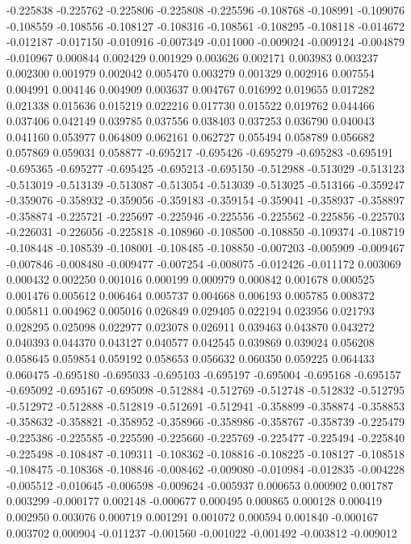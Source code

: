 -0.225838
-0.225762
-0.225806
-0.225808
-0.225596
-0.108768
-0.108991
-0.109076
-0.108559
-0.108556
-0.108127
-0.108316
-0.108561
-0.108295
-0.108118
-0.014672
-0.012187
-0.017150
-0.010916
-0.007349
-0.011000
-0.009024
-0.009124
-0.004879
-0.010967
0.000844
0.002429
0.001929
0.003626
0.002171
0.003983
0.003237
0.002300
0.001979
0.002042
0.005470
0.003279
0.001329
0.002916
0.007554
0.004991
0.004146
0.004909
0.003637
0.004767
0.016992
0.019655
0.017282
0.021338
0.015636
0.015219
0.022216
0.017730
0.015522
0.019762
0.044466
0.037406
0.042149
0.039785
0.037556
0.038403
0.037253
0.036790
0.040043
0.041160
0.053977
0.064809
0.062161
0.062727
0.055494
0.058789
0.056682
0.057869
0.059031
0.058877
-0.695217
-0.695426
-0.695279
-0.695283
-0.695191
-0.695365
-0.695277
-0.695425
-0.695213
-0.695150
-0.512988
-0.513029
-0.513123
-0.513019
-0.513139
-0.513087
-0.513054
-0.513039
-0.513025
-0.513166
-0.359247
-0.359076
-0.358932
-0.359056
-0.359183
-0.359154
-0.359041
-0.358937
-0.358897
-0.358874
-0.225721
-0.225697
-0.225946
-0.225556
-0.225562
-0.225856
-0.225703
-0.226031
-0.226056
-0.225818
-0.108960
-0.108500
-0.108850
-0.109374
-0.108719
-0.108448
-0.108539
-0.108001
-0.108485
-0.108850
-0.007203
-0.005909
-0.009467
-0.007846
-0.008480
-0.009477
-0.007254
-0.008075
-0.012426
-0.011172
0.003069
0.000432
0.002250
0.001016
0.000199
0.000979
0.000842
0.001678
0.000525
0.001476
0.005612
0.006464
0.005737
0.004668
0.006193
0.005785
0.008372
0.005811
0.004962
0.005016
0.026849
0.029405
0.022194
0.023956
0.021793
0.028295
0.025098
0.022977
0.023078
0.026911
0.039463
0.043870
0.043272
0.040393
0.044370
0.043127
0.040577
0.042545
0.039869
0.039024
0.056208
0.058645
0.059854
0.059192
0.058653
0.056632
0.060350
0.059225
0.064433
0.060475
-0.695180
-0.695033
-0.695103
-0.695197
-0.695004
-0.695168
-0.695157
-0.695092
-0.695167
-0.695098
-0.512884
-0.512769
-0.512748
-0.512832
-0.512795
-0.512972
-0.512888
-0.512819
-0.512691
-0.512941
-0.358899
-0.358874
-0.358853
-0.358632
-0.358821
-0.358952
-0.358966
-0.358986
-0.358767
-0.358739
-0.225479
-0.225386
-0.225585
-0.225590
-0.225660
-0.225769
-0.225477
-0.225494
-0.225840
-0.225498
-0.108487
-0.109311
-0.108362
-0.108816
-0.108225
-0.108127
-0.108518
-0.108475
-0.108368
-0.108846
-0.008462
-0.009080
-0.010984
-0.012835
-0.004228
-0.005512
-0.010645
-0.006598
-0.009624
-0.005937
0.000653
0.000902
0.001787
0.003299
-0.000177
0.002148
-0.000677
0.000495
0.000865
0.000128
0.000419
0.002950
0.003076
0.000719
0.001291
0.001072
0.000594
0.001840
-0.000167
0.003702
0.000904
-0.011237
-0.001560
-0.001022
-0.001492
-0.003812
-0.009012
